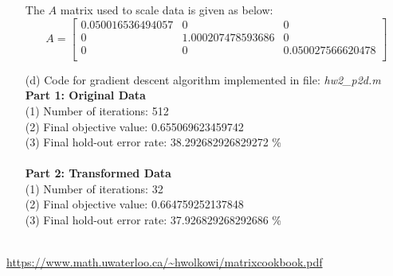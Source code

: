 \documentclass[fleqn]{article}
\begin{document}
\begin{itemize}
	The $A$ matrix used to scale data is given as below:\\
	\[
	A =
	\begin{bmatrix}
		0.050016536494057 & 0 & 0\\
		0 & 1.000207478593686 & 0\\
		0 & 0 & 0.050027566620478\\
	\end{bmatrix}
	\]

	\item[(d)]
	Code for gradient descent algorithm implemented in file: \textit{hw2\_p2d.m}\\
	\textbf{Part 1: Original Data}\\
	(1) Number of iterations: 512\\
	(2) Final objective value: 0.655069623459742\\
	(3) Final hold-out error rate: 38.292682926829272 \%\\
	\\
	\textbf{Part 2: Transformed Data}\\
	(1) Number of iterations: 32\\
	(2) Final objective value: 0.664759252137848\\
	(3) Final hold-out error rate: 37.926829268292686 \%\\
	\\

\end{itemize}
\begin{thebibliography}{99}
        \bibitem{[1]} \url{https://www.math.uwaterloo.ca/~hwolkowi/matrixcookbook.pdf}
\end{thebibliography}
\end{document}
